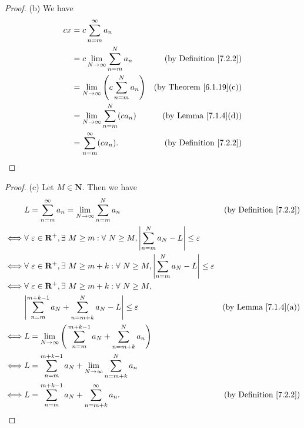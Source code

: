 \begin{proof}{(b)}
    We have
    \begin{align*}
        cx & = c \sum_{n = m}^\infty a_n                                                                  \\
           & = c \lim_{N \to \infty} \sum_{n = m}^N a_n             & \text{(by Definition \ref{7.2.2})}  \\
           & = \lim_{N \to \infty} \Bigg(c \sum_{n = m}^N a_n\Bigg) & \text{(by Theorem \ref{6.1.19}(c))} \\
           & = \lim_{N \to \infty} \sum_{n = m}^N (c a_n)           & \text{(by Lemma \ref{7.1.4}(d))}    \\
           & = \sum_{n = m}^\infty (c a_n).                         & \text{(by Definition \ref{7.2.2})}
    \end{align*}
\end{proof}

\begin{proof}{(c)}
    Let \(M \in \mathbf{N}\).
    Then we have
    \begin{align*}
             & L = \sum_{n = m}^\infty a_n = \lim_{N \to \infty} \sum_{n = m}^N a_n                                                             & \text{(by Definition \ref{7.2.2})} \\
        \iff & \forall\ \varepsilon \in \mathbf{R}^+, \exists\ M \geq m : \forall\ N \geq M, \abs*{\sum_{n = m}^N a_N - L} \leq \varepsilon                                          \\
        \iff & \forall\ \varepsilon \in \mathbf{R}^+, \exists\ M \geq m + k : \forall\ N \geq M, \abs*{\sum_{n = m}^N a_N - L} \leq \varepsilon                                      \\
        \iff & \forall\ \varepsilon \in \mathbf{R}^+, \exists\ M \geq m + k : \forall\ N \geq M,                                                                                     \\
             & \abs*{\sum_{n = m}^{m + k - 1} a_N + \sum_{n = m + k}^N a_N - L} \leq \varepsilon                                                & \text{(by Lemma \ref{7.1.4}(a))}   \\
        \iff & L = \lim_{N \to \infty} \Bigg(\sum_{n = m}^{m + k - 1} a_N + \sum_{n = m + k}^N a_n\Bigg)                                                                             \\
        \iff & L = \sum_{n = m}^{m + k - 1} a_N + \lim_{N \to \infty} \sum_{n = m + k}^N a_n                                                                                         \\
        \iff & L = \sum_{n = m}^{m + k - 1} a_N + \sum_{n = m + k}^\infty a_n.                                                                  & \text{(by Definition \ref{7.2.2})}
    \end{align*}
\end{proof}

